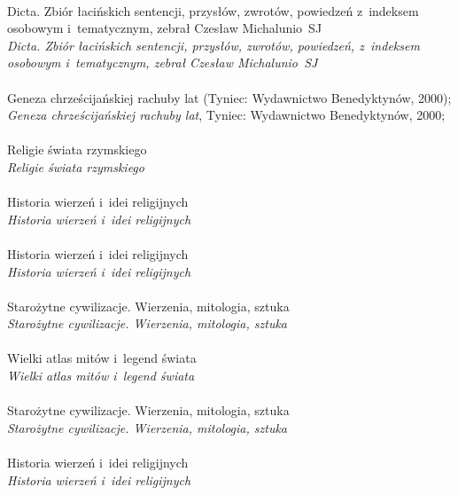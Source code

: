 \documentclass[a4paper,11pt]{article}
\numberwithin{equation}{section}
\begin{document}
\noindent
{} \\
\Jest Dicta. Zbiór łacińskich sentencji, przysłów, zwrotów, powiedzeń
z~indeksem osobowym i~tematycznym, zebrał Czesław Michalunio~SJ \\
\PowinnoByc \textit{Dicta. Zbiór łacińskich sentencji, przysłów, zwrotów,
  powiedzeń, z~indeksem osobowym i~tematycznym,
  zebrał Czesław Michalunio~SJ} \\
 \\
\Jest Geneza chrześcijańskiej rachuby lat (Tyniec: Wydawnictwo
Benedyktynów, 2000); \\
\PowinnoByc \textit{Geneza chrześcijańskiej rachuby lat}, Tyniec:
Wydawnictwo Benedyktynów, 2000; \\
 \\
\Jest Religie świata rzymskiego \\
\PowinnoByc \textit{Religie świata rzymskiego} \\
 \\
\Jest Historia wierzeń i~idei religijnych \\
\PowinnoByc \textit{Historia wierzeń i~idei religijnych} \\
 \\
\Jest Historia wierzeń i~idei religijnych \\
\PowinnoByc \textit{Historia wierzeń i~idei religijnych} \\
 \\
\Jest Starożytne cywilizacje. Wierzenia, mitologia, sztuka \\
\PowinnoByc \textit{Starożytne cywilizacje. Wierzenia, mitologia, sztuka} \\
 \\
\Jest Wielki atlas mitów i~legend świata \\
\PowinnoByc \textit{Wielki atlas mitów i~legend świata} \\
 \\
\Jest Starożytne cywilizacje. Wierzenia, mitologia, sztuka \\
\PowinnoByc \textit{Starożytne cywilizacje. Wierzenia, mitologia, sztuka} \\
 \\
\Jest Historia wierzeń i~idei religijnych \\
\PowinnoByc \textit{Historia wierzeń i~idei religijnych} \\
 \\
\end{document}

